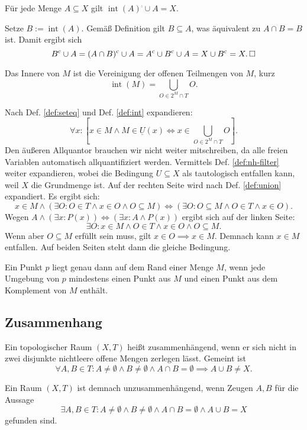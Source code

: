 \begin{Satz}
Für jede Menge $A\subseteq X$ gilt $\operatorname{int}(A)^\comp\cup A = X$.
\end{Satz}
\begin{Beweis}
Setze $B:=\operatorname{int}(A)$. Gemäß Definition gilt $B\subseteq A$,
was äquivalent zu $A\cap B = B$ ist. Damit ergibt sich
\[B^\mathrm c\cup A = (A\cap B)^\mathrm c\cup A = A^\mathrm c\cup B^\mathrm c\cup A
= X\cup B^\mathrm c = X.\,\square\]
\end{Beweis}

\begin{Satz}
Das Innere von $M$ ist die Vereinigung der offenen Teilmengen
von $M$, kurz%
\[\operatorname{int}(M) = \bigcup_{O\in 2^M\cap T} O.\]
\end{Satz}

\begin{Beweis}
Nach Def. \ref{def:seteq} und Def. \ref{def:int}
expandieren:%
\[\forall x\colon [x\in M\land M\in\underline U(x)
\iff x\in\bigcup_{O\in 2^M\cap T} O].\]
Den äußeren Allquantor brauchen wir nicht weiter mitschreiben, da alle
freien Variablen automatisch allquantifiziert werden.
Vermittels Def. \ref{def:nh-filter} weiter expandieren, wobei die
Bedingung $U\subseteq X$ als tautologisch entfallen kann,
weil $X$ die Grundmenge ist. Auf der rechten Seite wird nach Def.
\ref{def:union} expandiert. Es ergibt sich:
\[x\in M\land (\exists O\colon O\in T\land x\in O\land O\subseteq M)
\iff (\exists O\colon O\subseteq M\land O\in T\land x\in O).\]
Wegen $A\land(\exists x\colon P(x))\iff (\exists x\colon A\land P(x))$ ergibt
sich auf der linken Seite:
\[\exists O\colon x\in M\land O\in T\land x\in O\land O\subseteq M.\]
Wenn aber $O\subseteq M$ erfüllt sein muss, gilt
$x\in O\implies x\in M$. Demnach kann $x\in M$ entfallen.
Auf beiden Seiten steht dann die gleiche Bedingung.\,\qedsymbol
\end{Beweis}

\begin{Satz}\label{boundary-point-char}
Ein Punkt $p$ liegt genau dann auf dem Rand einer Menge $M$, wenn
jede Umgebung von $p$ mindestens einen Punkt aus $M$ und
einen Punkt aus dem Komplement von $M$ enthält.
\end{Satz}

\newpage
\subsection{Zusammenhang}

\begin{Definition}\newlinefirst
Ein topologischer Raum $(X,T)$ heißt zusammenhängend, wenn er sich
nicht in zwei disjunkte nichtleere offene Mengen zerlegen lässt. Gemeint ist
\[\forall A,B\in T\colon A\ne\emptyset\land B\ne\emptyset\land A\cap B = \emptyset \implies A\cup B\ne X.\]
\end{Definition}
 Ein Raum $(X,T)$ ist demnach unzusammenhängend, wenn
Zeugen $A,B$ für die Aussage
\[\exists A,B\in T\colon A\ne\emptyset\land B\ne\emptyset\land A\cap B = \emptyset \land A\cup B = X\]
gefunden sind.

